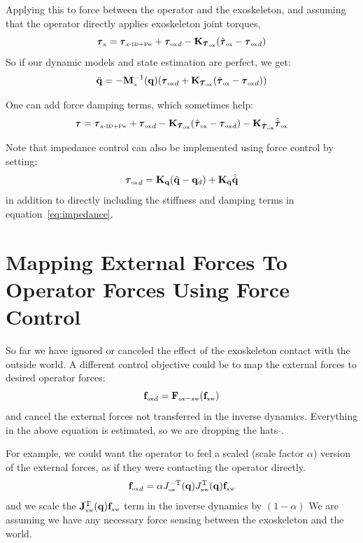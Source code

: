 \documentclass[letterpaper,12pt,fullpage]{article}
\newcommand{\myx}{{\mbox {\tiny x}}}
\newcommand{\ox}{{\mbox {\tiny ox}}}
\newcommand{\xw}{{\mbox {\tiny xw}}}
\newcommand{\xinvdynw}{{\mbox {\tiny x-ID+Fw}}}
\begin{document}
Applying this to force between the operator and the exoskeleton, and assuming
that the operator directly applies exoskeleton joint torques,
\begin{equation}
\vtau_{\myx} = \vtau_{\xinvdynw} + {\vtau_{\ox}}_d - \mK_{\vtau_{\ox}} ( \hat{\vtau}_{\ox} - {\vtau_{\ox}}_d )
\end{equation}
So if our dynamic models and state estimation are perfect, we get:
\begin{equation}
\ddot{\vq} = - \mM^{-1}_{\myx} (\vq) ({\vtau_{\ox}}_d + \mK_{\vtau_{\ox}} ( \hat{\vtau}_{\ox} - {\vtau_{\ox}}_d ))
\end{equation}

One can add force damping terms, which sometimes help:
\begin{equation}
\vtau = \vtau_{\xinvdynw} + {\vtau_{\ox}}_d - \mK_{\vtau_{\ox}} ( \hat{\vtau}_{\ox} - {\vtau_{\ox}}_d )
- \mK_{\dot{\vtau}_{\ox}} \hat{\dot{\vtau}}_{\ox}
\end{equation}

Note that impedance control can also be implemented using force control
by setting:
\begin{equation}
{\vtau_{\ox}}_d = \mK_{\vq}( \hat{\vq} - \vq_d ) + \mK_{\dot{\vq}} \hat{\dot{\vq}}
\end{equation}
in addition to directly including the stiffness and damping terms in
equation~\ref{eq:impedance}. 

\section{Mapping External Forces To Operator Forces Using Force Control}

So far we have ignored or canceled the effect of 
the exoskeleton contact with the outside world.
A different control objective could be to map the external forces to 
desired operator forces:
\begin{equation}
{\vf_{\ox}}_d = \mF_{\ox-\xw} ( \vf_{\xw} )
\end{equation}
and cancel the external forces not transferred in the inverse dynamics.
Everything in the above equation is estimated, so we are dropping the hats 
$\hat{\mbox{}}$.

For example, we could want the operator to feel a scaled (scale factor $\alpha$) 
version of the external
forces, as if they were contacting the operator directly.
\begin{equation}
{\vf_{\ox}}_d = \alpha J_{\ox}^{-\tr}(\vq) J_{\xw}^{\tr}(\vq) \vf_{\xw}
\end{equation}
and we scale the $\mJ_{\xw}^{\tr}(\vq) \vf_{\xw}$ term in the inverse dynamics
by $(1-\alpha)$
We are assuming we have any necessary force sensing between the exoskeleton and
the world.
\end{document}
